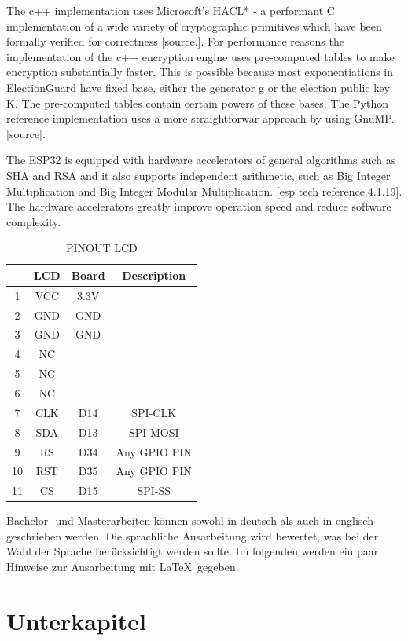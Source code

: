 The c++ implementation uses Microsoft's HACL* - a performant C implementation of a wide variety of cryptographic primitives which have been formally verified for correctness [source.]. For performance reasons the implementation of the c++ encryption engine  uses pre-computed tables to make encryption substantially faster. This is possible because most exponentiations in ElectionGuard have fixed base, either the generator g or the election public key K. The pre-computed tables contain certain powers of these bases. The Python reference implementation uses a more straightforwar approach by using GnuMP. [source].

The ESP32 is equipped with hardware accelerators of general algorithms such as SHA and RSA and it also supports independent arithmetic, such as Big Integer Multiplication and Big Integer Modular Multiplication. [esp tech reference,4.1.19]. The hardware accelerators greatly improve operation speed and reduce software complexity. 




\begin{table}[ht]
	\centering
	\begin{tabular}{|c|c|c|c|}
		\hline
		&LCD&Board&Description\\\hline
		1&VCC&3.3V\\\hline
		2&GND&GND\\\hline
		3&GND&GND\\\hline
		4&NC \\\hline
		5&NC \\\hline
		6&NC \\\hline
		7&CLK&D14&SPI-CLK\\\hline
		8&SDA&D13&SPI-MOSI\\\hline
		9&RS&D34&Any GPIO PIN\\\hline
		10&RST&D35&Any GPIO PIN\\\hline
		11&CS&D15&SPI-SS\\\hline
	\end{tabular}
	\caption{PINOUT LCD}
	\label{Tab:PINOUT_LCD}
\end{table}

Bachelor- und Masterarbeiten können sowohl in deutsch als auch in englisch geschrieben werden. 
Die sprachliche Ausarbeitung wird bewertet, was bei der Wahl der Sprache berücksichtigt werden sollte. 
Im folgenden werden ein paar Hinweise zur Ausarbeitung  mit \LaTeX\ gegeben.


\section{Unterkapitel}
